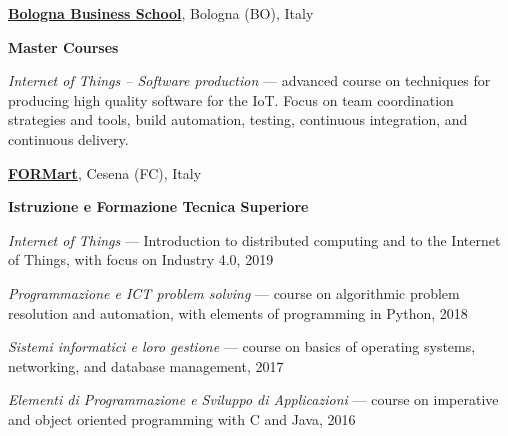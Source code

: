 \href{https://www.bbs.unibo.eu/hp/}{\textbf{Bologna Business School}}, Bologna (BO), Italy
\begin{outerlist}
\item[] \textbf{Master Courses} %
    \begin{innerlist}
        \item \textit{Internet of Things -- Software production} --- advanced course on techniques for producing high quality software for the IoT. Focus on team coordination strategies and tools, build automation, testing, continuous integration, and continuous delivery.
\end{innerlist}
\halfblankline
\end{outerlist}

\href{http://www.formart.it/}{\textbf{FORMart}}, Cesena (FC), Italy
\begin{outerlist}
\item[] \textbf{Istruzione e Formazione Tecnica Superiore}
    \begin{innerlist}
        \item \textit{Internet of Things} --- Introduction to distributed computing and to the Internet of Things, with focus on Industry 4.0, 2019
        \item \textit{Programmazione e ICT problem solving} --- course on algorithmic problem resolution and automation, with elements of programming in Python, 2018
        \item \textit{Sistemi informatici e loro gestione} --- course on basics of operating systems, networking, and database management, 2017
        \item \textit{Elementi di Programmazione e Sviluppo di Applicazioni} --- course on imperative and object oriented programming with C and Java, 2016
    \end{innerlist}
\halfblankline
\end{outerlist}
